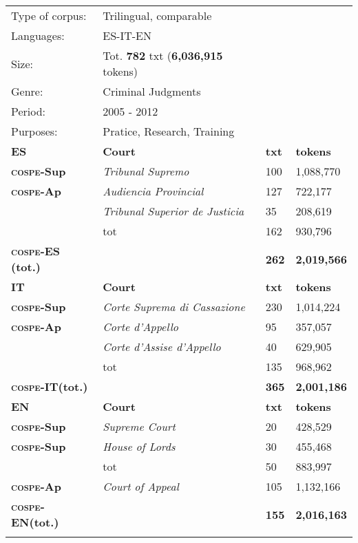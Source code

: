 \documentclass[output=paper]{LSP/langsci}
\begin{document}
\begin{table}
     \centering
     \begin{tabular}{llll}
     \lsptoprule
Type of corpus: & Trilingual, comparable && \\
Languages: & ES-IT-EN && \\
Size: & Tot. \textbf{782} txt (\textbf{6,036,915} tokens) && \\
Genre: & Criminal Judgments && \\
Period: & 2005 - 2012 && \\
Purposes: & Pratice, Research, Training   && \\
     \lsptoprule
       \textbf{ES}  & \textbf{Court}       & \textbf{txt}  &  \textbf{tokens} \\ \midrule
       \textbf{\textsc{cospe}-Sup}    & \textit{Tribunal Supremo}          & 100				& 1,088,770\\
       \textbf{\textsc{cospe}-Ap}       & \textit{Audiencia Provincial}    & 127				& 722,177\\
                     & \textit{Tribunal Superior de Justicia}      & 35				& 208,619\\
                      & tot             & 162				& 930,796\\ \midrule
       \textbf{\textsc{cospe}-ES (tot.)}    &              & \textbf{262}				& \textbf{2,019,566}\\ 

\lspbottomrule
       \textbf{IT}  & \textbf{Court}       & \textbf{txt}  & \textbf{tokens} \\ \midrule
       \textbf{\textsc{cospe}-Sup}    & \textit{Corte Suprema di Cassazione}             & 230				& 1,014,224\\
       \textbf{\textsc{cospe}-Ap}       & \textit{Corte d’Appello}             & 95				& 357,057\\
                     & \textit{Corte d’Assise d’Appello}             & 40				& 629,905\\
                      & tot             & 135				& 968,962\\ \hline
       \textbf{\textsc{cospe}-IT(tot.)}   &    &     \textbf{365}				& \textbf{2,001,186}\\  
\lspbottomrule

       \textbf{EN}  & \textbf{Court}       & \textbf{txt}  & \textbf{tokens} \\ \midrule
       \textbf{\textsc{cospe}-Sup}    & \textit{Supreme Court}             & 20				& 428,529\\
       \textbf{\textsc{cospe}-Sup}       & \textit{House of Lords}         & 30				& 455,468\\
                                & tot     & 50				& 883,997\\
       \textbf{\textsc{cospe}-Ap}  & \textit{Court of Appeal} & 105				& 1,132,166\\ \midrule
       \textbf{\textsc{cospe}-EN(tot.)}   &    &     \textbf{155}				& \textbf{2,016,163}\\  
\lspbottomrule
\end{tabular}
 

\end{table}
\end{document}
